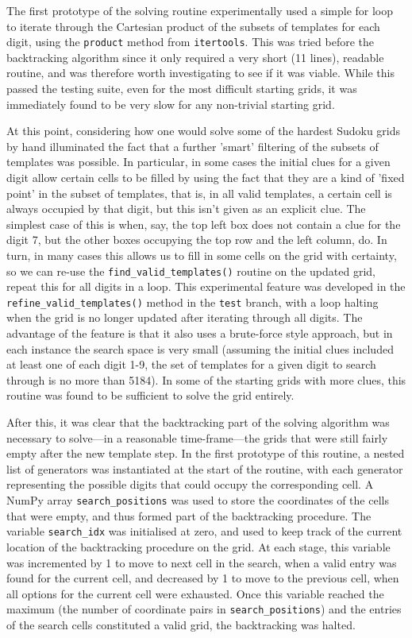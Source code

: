 \documentclass[12pt]{article}
\begin{document}
The first prototype of the solving routine experimentally used a simple for loop to iterate through the Cartesian product of the subsets of templates for each digit, using the \texttt{product} method from \texttt{itertools}.
This was tried before the backtracking algorithm since it only required a very short (11 lines), readable routine, and was therefore worth investigating to see if it was viable.
While this passed the testing suite, even for the most difficult starting grids, it was immediately found to be very slow for any non-trivial starting grid.

At this point, considering how one would solve some of the hardest Sudoku grids by hand illuminated the fact that a further 'smart' filtering of the subsets of templates was possible.
In particular, in some cases the initial clues for a given digit allow certain cells to be filled by using the fact that they are a kind of 'fixed point' in the subset of templates, that is, in all valid templates, a certain cell is always occupied by that digit, but this isn't given as an explicit clue.
The simplest case of this is when, say, the top left box does not contain a clue for the digit 7, but the other boxes occupying the top row and the left column, do.
In turn, in many cases this allows us to fill in some cells on the grid with certainty, so we can re-use the \texttt{find\_valid\_templates()} routine on the updated grid, repeat this for all digits in a loop.
This experimental feature was developed in the \texttt{refine\_valid\_templates()} method in the \texttt{test} branch, with a loop halting when the grid is no longer updated after iterating through all digits.
The advantage of the feature is that it also uses a brute-force style approach, but in each instance the search space is very small (assuming the initial clues included at least one of each digit 1-9, the set of templates for a given digit to search through is no more than 5184).
In some of the starting grids with more clues, this routine was found to be sufficient to solve the grid entirely.

After this, it was clear that the backtracking part of the solving algorithm was necessary to solve---in a reasonable time-frame---the grids that were still fairly empty after the new template step.
In the first prototype of this routine, a nested list of generators was instantiated at the start of the routine, with each generator representing the possible digits that could occupy the corresponding cell.
A NumPy array \texttt{search\_positions} was used to store the coordinates of the cells that were empty, and thus formed part of the backtracking procedure.
The variable \texttt{search\_idx} was initialised at zero, and used to keep track of the current location of the backtracking procedure on the grid.
At each stage, this variable was incremented by 1 to move to next cell in the search, when a valid entry was found for the current cell, and decreased by 1 to move to the previous cell, when all options for the current cell were exhausted.
Once this variable reached the maximum (the number of coordinate pairs in \texttt{search\_positions}) and the entries of the search cells constituted a valid grid, the backtracking was halted.
\end{document}
